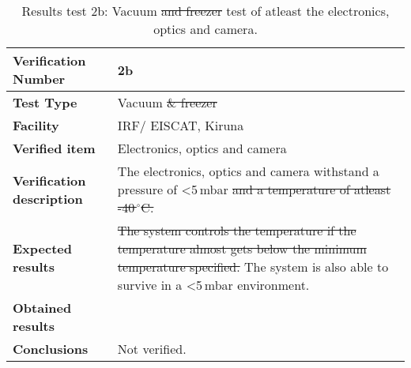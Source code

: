 \begin{table}[H]
\centering

\begin{tabular}{|m{}| m{} |}
\hline
\textbf{Verification Number} 		& 2b 							 \\ \hline
\textbf{Test Type} 					& Vacuum \st{\& freezer}				 \\ \hline
\textbf{Facility} 					& IRF/ EISCAT, Kiruna 			 \\ \hline
\textbf{Verified item} 				& Electronics, optics and camera \\ \hline

\textbf{Verification description} 	& The electronics, optics and camera withstand a pressure of <5\,mbar \st{and a temperature of atleast -40\,$^\circ$C.} \\ \hline

\textbf{Expected results} 			& \st{The system controls the temperature if the temperature almost gets below the minimum temperature specified.} The system is also able to survive in a <5\,mbar environment.\\ \hline

\textbf{Obtained results} 			& \\ \hline

\textbf{Conclusions} 				& Not verified.		\\ \hline
\end{tabular}
\caption{Results test 2b: Vacuum \st{and freezer} test of atleast the electronics, optics and camera.}
\label{tab:testresult2:vacuum}
\end{table}


\raggedbottom